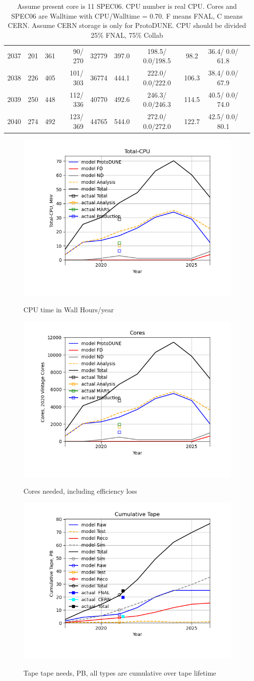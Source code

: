 \documentclass[12pt]{article}
\begin{document}
\begin{table}
\begin{tabular}[h]{crrrrrcccc}
2037&	 201&	 361&	  90/ 270&	 32779&	    397.0&	 198.5/  0.0/198.5&	     98.2&	  36.4/  0.0/ 61.8\\
2038&	 226&	 405&	 101/ 303&	 36774&	    444.1&	 222.0/  0.0/222.0&	    106.3&	  38.4/  0.0/ 67.9\\
2039&	 250&	 448&	 112/ 336&	 40770&	    492.6&	 246.3/  0.0/246.3&	    114.5&	  40.5/  0.0/ 74.0\\
2040&	 274&	 492&	 123/ 369&	 44765&	    544.0&	 272.0/  0.0/272.0&	    122.7&	  42.5/  0.0/ 80.1\\
\end{tabular}
\caption{Assume present core is   11 SPEC06. CPU number is real CPU. Cores and SPEC06 are Walltime with CPU/Walltime =  0.70.  F means FNAL, C means CERN. Assume CERN storage is only  for ProtoDUNE. CPU should be divided 25\% FNAL, 75\% Collab}\normalsize
 \end{table}
\pagebreak\begin{figure}
\centering\includegraphics[height=0.4\textwidth]{Total-CPU.png}\label{TotalCPU}
\caption{CPU time in Wall Hours/year}
\end{figure}
\begin{figure}
\centering\includegraphics[height=0.4\textwidth]{Cores.png}\label{Cores}
\caption{Cores needed, including efficiency loss}
\end{figure}
\begin{figure}
\centering\includegraphics[height=0.4\textwidth]{Cumulative-Tape.png}\label{CumulativeTape}
\caption{Tape tape needs, PB, all types are cumulative over tape lifetime}
\end{figure}
\end{document}
